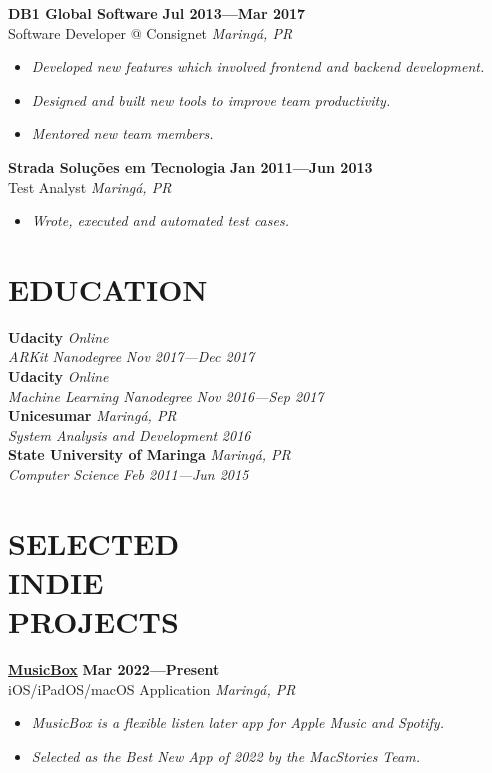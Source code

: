 \documentclass[line,margin]{res}
\begin{document}
\begin{resume}
  {\bf DB1 Global Software} \hfill {\bf Jul 2013---Mar 2017} \\
  Software Developer @ Consignet \hfill {\sl Maring\'a, PR}\\[-6pt]
  \begin{itemize}
    \item {\sl Developed new features which involved
               frontend and backend development.}
    \item {\sl Designed and built new tools to improve team productivity.}
    \item {\sl Mentored new team members.}
  \end{itemize}

  {\bf Strada Solu\c{c}\~oes em Tecnologia} \hfill {\bf Jan 2011---Jun 2013} \\
  Test Analyst \hfill {\sl Maring\'a, PR}\\[-6pt]
    \begin{itemize}
    \item {\sl Wrote, executed and automated test cases.}
  \end{itemize}


\section{EDUCATION}
  {\bf Udacity} \hfill {\sl Online} \\
  {\sl ARKit Nanodegree} \hfill {\sl Nov 2017---Dec 2017}\\[6pt]
  {\bf Udacity} \hfill {\sl Online} \\
  {\sl Machine Learning Nanodegree} \hfill {\sl Nov 2016---Sep 2017}\\[6pt]
  {\bf Unicesumar} \hfill {\sl Maring\'a, PR} \\
  {\sl System Analysis and Development} \hfill {\sl 2016}\\[6pt]
  {\bf State University of Maringa} \hfill {\sl Maring\'a, PR} \\
  {\sl Computer Science} \hfill {\sl Feb 2011---Jun 2015}


\section{SELECTED \\ INDIE \\ PROJECTS}
  {\bf \href{https://apps.apple.com/us/app/id1614730313}{MusicBox}} \hfill {\bf Mar 2022---Present} \\
  iOS/iPadOS/macOS Application \hfill {\sl Maring\'a, PR}\\[-6pt]
    \begin{itemize}
    \item {\sl MusicBox is a flexible listen later app for Apple Music and Spotify.}
    \item {\sl Selected as the Best New App of 2022 by the MacStories Team.}
    \end{itemize}


\end{resume}
\end{document}
